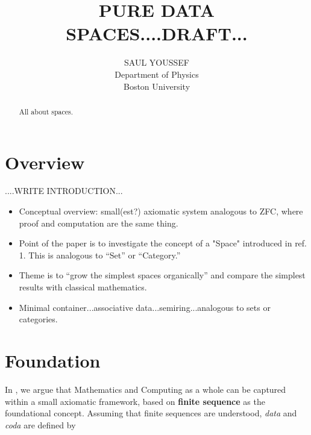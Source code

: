 \documentclass[11pt]{article}
\begin{document}
\title{\bf {PURE DATA SPACES....DRAFT...}}
\author{%
  SAUL YOUSSEF%
  \hfil \\
  Department of Physics \\
  Boston University \\
}
\maketitle
\begin{abstract}
All about spaces.
\end{abstract}

\theoremstyle{definition}
\newtheorem{axiom}{Axiom}
\newtheorem*{axiom*}{Axiom}
\newtheorem*{fact}{Fact}
\newtheorem{theorem}{Theorem}[section]
\newtheorem{lemma}{Lemma}

\newtheorem{definition}{Definition}

\newtheorem*{remark}{}

\section{Overview}

....WRITE INTRODUCTION...

\begin{itemize}
\item Conceptual overview: small(est?) axiomatic system analogous to ZFC, where proof and computation are the same thing.
\item Point of the paper is to investigate the concept of a "Space" introduced in ref. 1.  This is analogous to ``Set'' or ``Category.''
\item Theme is to ``grow the simplest spaces organically'' and compare the simplest results with classical mathematics. 
\item Minimal container...associative data...semiring...analogous to sets or categories.
\end{itemize}

\section{Foundation}  

In \cite{PDF}, we argue that Mathematics and Computing as a whole can be captured within a small axiomatic framework, 
based on {\bf finite sequence} as the foundational concept.  Assuming that finite sequences are understood, {\it data} and {\it coda} are defined by 
\end{document}
